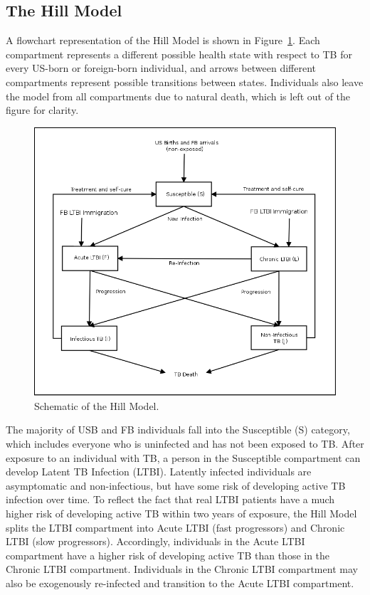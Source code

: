 \documentclass{amsart}
\begin{document}
\subsection{The Hill Model}
A flowchart representation of the Hill Model is shown in
Figure~\ref{fig:hillModelSchematic}. Each compartment represents a different
possible health state with respect to TB for every US-born or foreign-born
individual, and arrows between different compartments represent possible
transitions between states.  Individuals also leave the model from all
compartments due to natural death, which is left out of the figure for clarity.

\begin{figure}[h]
  \begin{center}
    \includegraphics[scale=0.25]{figures/HillModelFlowChart.png}
  \end{center}
  \caption{Schematic of the Hill Model.}
  \label{fig:hillModelSchematic}
\end{figure}

The majority of USB and FB individuals fall into the Susceptible (S) category,
which includes everyone who is uninfected and has not been exposed to TB.  After
exposure to an individual with TB, a person in the Susceptible compartment can
develop Latent TB Infection (LTBI). Latently infected individuals are
asymptomatic and non-infectious, but have some risk of developing active TB
infection over time. To reflect the fact that real LTBI patients have a
much higher risk of developing active TB within two years of exposure, the Hill
Model splits the LTBI compartment into Acute LTBI (fast progressors) and Chronic
LTBI (slow progressors). Accordingly, individuals in the Acute LTBI compartment
have a higher risk of developing active TB than those in the Chronic LTBI
compartment. Individuals in the Chronic LTBI compartment may also be
exogenously re-infected and transition to the Acute LTBI compartment. 
\end{document}
